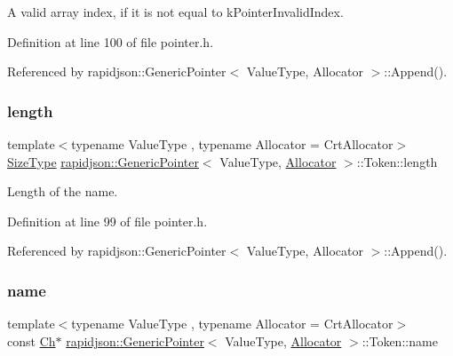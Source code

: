 A valid array index, if it is not equal to k\+Pointer\+Invalid\+Index. 



Definition at line 100 of file pointer.\+h.



Referenced by rapidjson\+::\+Generic\+Pointer$<$ Value\+Type, Allocator $>$\+::\+Append().

\mbox{\label{structrapidjson_1_1_generic_pointer_1_1_token_ad866d674dbddf9690ad571b65e968600}} 
\subsubsection{\texorpdfstring{length}{length}}
{\footnotesize\ttfamily template$<$typename Value\+Type , typename Allocator  = Crt\+Allocator$>$ \\
\mbox{\hyperlink{namespacerapidjson_a44eb33eaa523e36d466b1ced64b85c84}{Size\+Type}} \mbox{\hyperlink{classrapidjson_1_1_generic_pointer}{rapidjson\+::\+Generic\+Pointer}}$<$ Value\+Type, \mbox{\hyperlink{classrapidjson_1_1_allocator}{Allocator}} $>$\+::Token\+::length}



Length of the name. 



Definition at line 99 of file pointer.\+h.



Referenced by rapidjson\+::\+Generic\+Pointer$<$ Value\+Type, Allocator $>$\+::\+Append().

\mbox{\label{structrapidjson_1_1_generic_pointer_1_1_token_aceb59c9796418c20da27b03bf1948fe8}} 
\subsubsection{\texorpdfstring{name}{name}}
{\footnotesize\ttfamily template$<$typename Value\+Type , typename Allocator  = Crt\+Allocator$>$ \\
const \mbox{\hyperlink{classrapidjson_1_1_generic_pointer_a850f78846c5548565f8395be5f3427b7}{Ch}}$\ast$ \mbox{\hyperlink{classrapidjson_1_1_generic_pointer}{rapidjson\+::\+Generic\+Pointer}}$<$ Value\+Type, \mbox{\hyperlink{classrapidjson_1_1_allocator}{Allocator}} $>$\+::Token\+::name}



